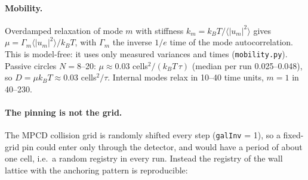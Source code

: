 \paragraph{Mobility.} Overdamped relaxation of mode $m$ with stiffness $k_m=k_BT/\langle|u_m|^2\rangle$ gives
$\mu=\Gamma_m\langle|u_m|^2\rangle/k_BT$, with $\Gamma_m$ the inverse $1/e$ time of the mode autocorrelation. This is model-free: it uses only
measured variances and times (\texttt{mobility.py}). Passive circles $N=8$--20: $\mu\approx0.03$ cells$^2/(k_BT\,\tau)$ (median per run
0.025--0.048), so $D=\mu k_BT\approx0.03$ cells$^2/\tau$. Internal modes relax in 10--40 time units, $m=1$ in 40--230.

\paragraph{The pinning is not the grid.} The MPCD collision grid is randomly shifted every step (\texttt{galInv} = 1), so a fixed-grid pin could
enter only through the detector, and would have a period of about one cell, i.e.\ a random registry in every run. Instead the registry of the wall
lattice with the anchoring pattern is reproducible:

